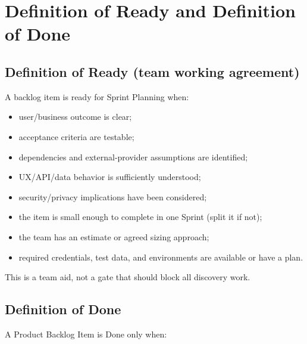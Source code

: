 \chapter{Definition of Ready and Definition of Done}

\section{Definition of Ready (team working agreement)}

A backlog item is ready for Sprint Planning when:

\begin{itemize}
\item user/business outcome is clear;
\item acceptance criteria are testable;
\item dependencies and external-provider assumptions are identified;
\item UX/API/data behavior is sufficiently understood;
\item security/privacy implications have been considered;
\item the item is small enough to complete in one Sprint (split it if not);
\item the team has an estimate or agreed sizing approach;
\item required credentials, test data, and environments are available or have a plan.
\end{itemize}
This is a team aid, not a gate that should block all discovery work.



\section{Definition of Done}

A Product Backlog Item is Done only when:

